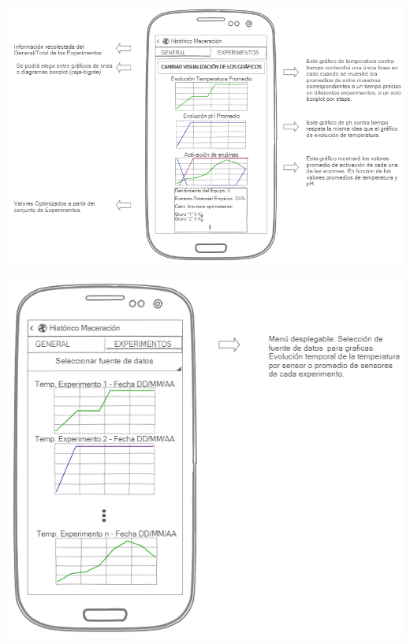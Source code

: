     \begin{minipage}{0.95\textwidth}

        \centering
        \includegraphics[scale=0.7]{Anexo/MockUp/MashExpHistoryActivity-GeneralFragment.jpg}
        \label{fig:MockUpGeneralFragment}
    \end{minipage}
    
    \begin{minipage}{0.95\textwidth}

        \centering
        \includegraphics[scale=0.7]{Anexo/MockUp/MashExpHistoryActivity-ExperimentFragment.jpg}
        \label{fig:MockUpExperimentFragment}
    \end{minipage}
    
